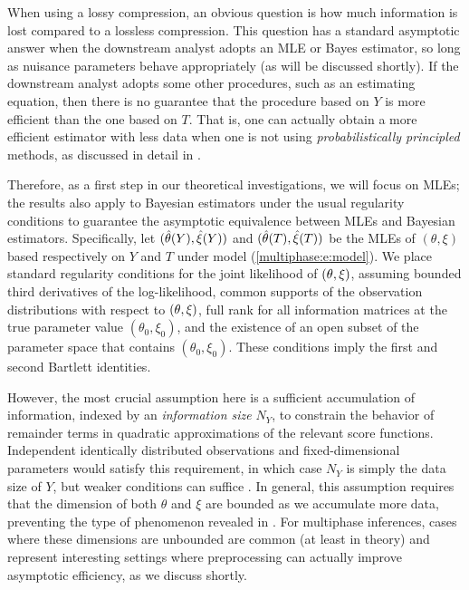 When using a lossy compression, an obvious question is how much information is lost compared to a lossless compression. This question has a standard asymptotic answer when the downstream analyst adopts an MLE or Bayes estimator, so long as nuisance parameters behave appropriately (as will be discussed shortly). If the downstream analyst adopts some other procedures, such as an estimating equation, then there is no guarantee that the procedure based on $Y$ is more efficient than the one based on $T$. That is, one can actually obtain a more efficient estimator with less data when one is not using \textit{probabilistically principled}  methods, as  discussed in detail in  \citet{Meng2012}.

Therefore, as a first step in our theoretical investigations, we will focus on MLEs; the results also apply to Bayesian estimators under the usual regularity conditions to guarantee the asymptotic equivalence  between MLEs and Bayesian estimators. Specifically,  let $(\hat{\theta}(Y), \hat{\xi}(Y))$ and $(\hat{\theta}(T), \hat{\xi}(T))$ be the MLEs of $(\theta, \xi)$ based respectively on $Y$ and $T$ under model (\ref{multiphase:e:model}).  We place standard regularity conditions for the joint likelihood of $(\theta, \xi)$, assuming bounded third derivatives of the log-likelihood, common supports of the observation distributions with respect to $(\theta, \xi)$, full rank for all information matrices at the true parameter value $(\theta_0, \xi_0)$, and the existence of an open subset of the parameter space that contains $(\theta_0, \xi_0)$. These conditions imply the first and second Bartlett identities.

However, the most crucial assumption here is  a sufficient accumulation of information, indexed by an \textit{information size} $N_Y$, to constrain the behavior of remainder terms in quadratic approximations of the relevant score functions.
Independent identically distributed observations and fixed-dimensional parameters would satisfy this requirement, in which case $N_Y$ is simply the data size of $Y$,  but weaker conditions can suffice \citep[for an overview, see][]{Lehmann1998}.
In general, this assumption requires that the dimension of both $\theta$ and $\xi$ are bounded as we accumulate more data, preventing the type of phenomenon revealed in \citet{NeymanScott1948}. For multiphase inferences, cases where these dimensions are unbounded are common (at least in theory) and represent interesting settings where preprocessing can actually improve asymptotic efficiency, as we discuss shortly.    

